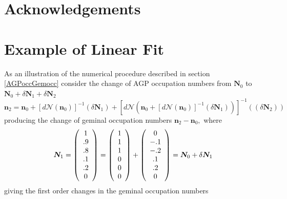 \documentclass[aps,preprint]{revtex4}%
\begin{document}
\section{Acknowledgements}

\appendix

\section{Example of Linear Fit\label{LinfitEX}}

As an illustration of the numerical procedure described in section
\ref{AGPoccGemocc} consider the change of AGP occupation numbers from
$\bm{N}_{0}$ to $\bm{N}_{0}+\delta\bm{N}_{1}+\delta\bm{N}_{2}$
\begin{equation}
\bm{n}_{2}=\bm{n}_{0}+\left[  d\mathcal{N}\left(  \bm{n}_{0}\right)  \right]
^{-1}\left(  \delta\bm{N}_{1}\right)  +\left[  d\mathcal{N}\left(
\bm{n}_{0}+\left[  d\mathcal{N}\left(  \bm{n}_{0}\right)  \right]
^{-1}\left(  \delta\bm{N}_{1}\right)  \right)  \right]  ^{-1}\left(  \left(
\delta\bm{N}_{2}\right)  \right)
\end{equation}
producing the change of geminal occupation numbers $\bm{n}_{2}-\bm{n}_{0},$
where
\begin{equation}
\bm{N}_{1}=\left(
\begin{array}
[c]{c}%
1\\
.9\\
.8\\
.1\\
.2\\
0
\end{array}
\right)  =\left(
\begin{array}
[c]{c}%
1\\
1\\
1\\
0\\
0\\
0
\end{array}
\right)  +\left(
\begin{array}
[c]{c}%
0\\
-.1\\
-.2\\
.1\\
.2\\
0
\end{array}
\right)  =\bm{N}_{0}+\delta\bm{N}_{1}%
\end{equation}
giving the first order changes in the geminal occupation numbers
\end{document}
